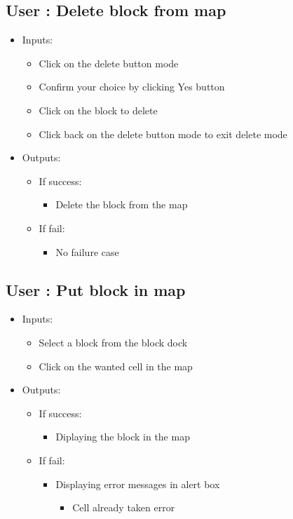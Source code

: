 \subsection{User : Delete block from map}
	\begin{itemize}
	
	
		\item Inputs:
			\begin{itemize}
				\item Click on the delete button mode
				\item Confirm your choice by clicking Yes button
				\item Click on the block to delete
				\item Click back on the delete button mode to exit delete mode
			\end{itemize}
			\item Outputs:
				\begin{itemize}
					\item If success:					
					\begin{itemize}
						\item Delete the block from the map
					\end{itemize}
					\item If fail:
					\begin{itemize}
					\item No failure case
					\end{itemize}
				\end{itemize}
	\end{itemize}
	
\subsection{User : Put block in map}
	\begin{itemize}
	
	
		\item Inputs:
			\begin{itemize}
				\item Select a block from the block dock
				\item Click on the wanted cell in the map
			\end{itemize}
			\item Outputs:
				\begin{itemize}
					\item If success:					
					\begin{itemize}
						\item Diplaying the block in the map
					\end{itemize}
					\item If fail:
					\begin{itemize}
					\item Displaying error messages in alert box
					\begin{itemize}
						\item Cell already taken error
					\end{itemize}
					\end{itemize}
				\end{itemize}
	\end{itemize}
	
